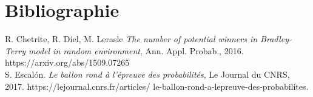 \documentclass[a4paper]{article}
\begin{document}
\section{Bibliographie}
R. Chetrite, R. Diel, M. Lerasle \textit{The number of potential winners in Bradley-Terry model in random environment}, Ann. Appl. Probab., 2016. https://arxiv.org/abs/1509.07265 \\

S. Escalón. \textit{Le ballon rond à l’épreuve des probabilités}, Le Journal du CNRS, 2017. https://lejournal.cnrs.fr/articles/
le-ballon-rond-a-lepreuve-des-probabilites.
\end{document}
